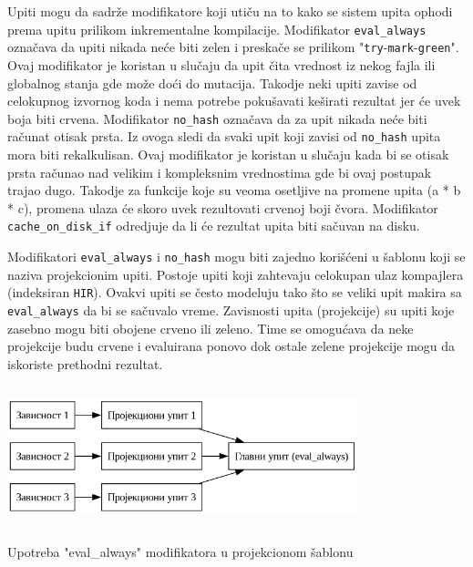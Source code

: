 Upiti mogu da sadrže modifikatore koji utiču na to kako se sistem upita ophodi prema upitu prilikom inkrementalne kompilacije.
Modifikator \verb|eval_always| označava da upiti nikada neće biti zelen i preskače se prilikom "\verb|try|-\verb|mark|-\verb|green|".
Ovaj modifikator je koristan u slučaju da upit čita vrednost iz nekog fajla ili globalnog stanja gde može doći do mutacija. Takodje neki 
upiti zavise od celokupnog izvornog koda i nema potrebe pokušavati keširati rezultat jer će uvek boja biti crvena. Modifikator 
\verb|no_hash| označava da za upit nikada neće biti računat otisak prsta. Iz ovoga sledi da svaki upit koji zavisi od \verb|no_hash|
upita mora biti rekalkulisan. Ovaj modifikator je koristan u slučaju kada bi se otisak prsta računao nad velikim i kompleksnim 
vrednostima gde bi ovaj postupak trajao dugo. Takodje za funkcije koje su veoma osetljive na promene upita (a * b * c), promena 
ulaza će skoro uvek rezultovati crvenoj boji čvora. Modifikator \verb|cache_on_disk_if| odredjuje da li će rezultat upita biti 
sačuvan na disku. 

Modifikatori \verb|eval_always| i \verb|no_hash| mogu biti zajedno korišćeni u šablonu koji se naziva projekcionim upiti. Postoje upiti koji zahtevaju 
celokupan ulaz kompajlera (indeksiran \verb|HIR|). Ovakvi upiti se često modeluju tako što se veliki upit makira sa \verb|eval_always|
da bi se sačuvalo vreme. Zavisnosti upita (projekcije) su upiti koje zasebno mogu biti obojene crveno ili zeleno. Time se omogućava 
da neke projekcije budu crvene i evaluirana ponovo dok ostale zelene projekcije mogu da iskoriste prethodni rezultat.

\begin{listing}[H]
\begin{center}
\includegraphics[width=4in, height=1.6in]{assets/images/projection_query.png}
\end{center}
\caption{Upotreba "eval\_always" modifikatora u projekcionom šablonu}
\label{lst:projection_query}
\end{listing}
